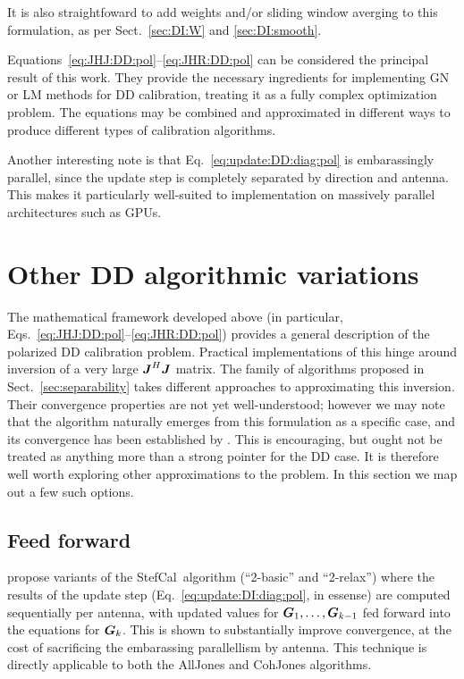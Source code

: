 \documentclass[useAMS,usenatbib]{mn2e}
\newcommand{\mat}[1]{{\bmath{#1}}}
\newcommand{\JJ}{\mat{J}} %
\newcommand{\GG}{\mat{G}}
\newcommand{\JHJ}{\JJ^H\JJ} %
\newcommand{\StefCal}{{\sc StefCal}}
\begin{document}
It is also straightfoward to add weights and/or sliding window averging to this formulation, as per 
Sect.~\ref{sec:DI:W} and \ref{sec:DI:smooth}.

Equations~\ref{eq:JHJ:DD:pol}--\ref{eq:JHR:DD:pol} can be considered the principal result of this work.
They provide the necessary ingredients for implementing GN or LM methods for DD calibration, treating it as a 
fully complex optimization problem. The equations may be combined and approximated in different 
ways to produce different types of calibration algorithms. 

Another interesting note is that Eq.~\ref{eq:update:DD:diag:pol} is embarassingly parallel, since the update step is 
completely separated by direction and antenna. This makes it particularly well-suited to implementation on massively 
parallel architectures such as GPUs.

\section{Other DD algorithmic variations}
\label{sec:variations}

The mathematical framework developed above (in particular, Eqs.~\ref{eq:JHJ:DD:pol}--\ref{eq:JHR:DD:pol}) provides
a general description of the polarized DD calibration problem. Practical implementations of this hinge around inversion of
a very large $\JHJ$ matrix. The family of algorithms proposed in Sect.~\ref{sec:separability} takes different approaches
to approximating this inversion. Their convergence properties are not yet well-understood; however we may note that 
the {\sc \StefCal} algorithm naturally emerges from this formulation as a specific case, and its convergence has been 
established by \citet{Stefcal}. This is encouraging, but ought not be treated as anything more than a strong pointer for 
the DD case. It is therefore well worth exploring other approximations to the problem. In this section we map out a few 
such options.

\subsection{Feed forward}
\label{sec:feed-forward}

\citet{Stefcal} propose variants of the \StefCal\ algorithm (``2-basic'' and ``2-relax'') where the results of the 
update step (Eq.~\ref{eq:update:DI:diag:pol}, in essense) are computed sequentially per antenna, with updated
values for $\GG_1,\dots,\GG_{k-1}$ fed forward into the equations for $\GG_k$. This is shown to 
substantially improve convergence, at the cost of sacrificing the embarassing parallellism by antenna. This technique 
is directly applicable to both the {\sc AllJones} and {\sc CohJones} algorithms. 
\end{document}

